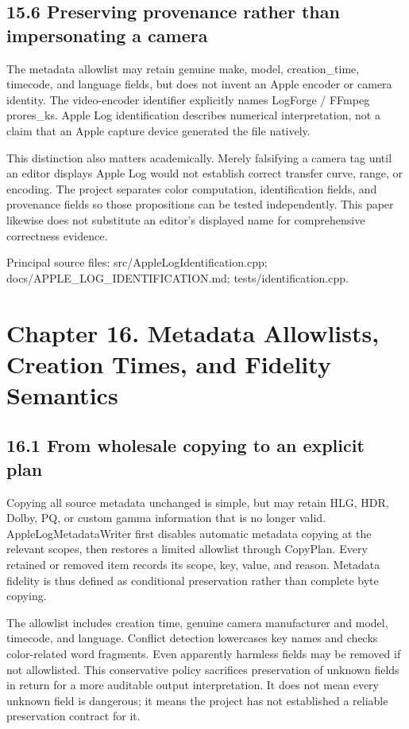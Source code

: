 \documentclass[11pt,a4paper,openany]{book}
\begin{document}
\section*{15.6 Preserving provenance rather than impersonating a camera}
The metadata allowlist may retain genuine make, model, creation\_time, timecode, and language fields, but does not invent an Apple encoder or camera identity. The video-encoder identifier explicitly names LogForge / FFmpeg prores\_ks. Apple Log identification describes numerical interpretation, not a claim that an Apple capture device generated the file natively.

This distinction also matters academically. Merely falsifying a camera tag until an editor displays Apple Log would not establish correct transfer curve, range, or encoding. The project separates color computation, identification fields, and provenance fields so those propositions can be tested independently. This paper likewise does not substitute an editor's displayed name for comprehensive correctness evidence.


\par\small Principal source files: src/AppleLogIdentification.cpp; docs/APPLE\_LOG\_IDENTIFICATION.md; tests/identification.cpp.\normalsize

\chapter*{Chapter 16. Metadata Allowlists, Creation Times, and Fidelity Semantics}

\section*{16.1 From wholesale copying to an explicit plan}
Copying all source metadata unchanged is simple, but may retain HLG, HDR, Dolby, PQ, or custom gamma information that is no longer valid. AppleLogMetadataWriter first disables automatic metadata copying at the relevant scopes, then restores a limited allowlist through CopyPlan. Every retained or removed item records its scope, key, value, and reason. Metadata fidelity is thus defined as conditional preservation rather than complete byte copying.

The allowlist includes creation time, genuine camera manufacturer and model, timecode, and language. Conflict detection lowercases key names and checks color-related word fragments. Even apparently harmless fields may be removed if not allowlisted. This conservative policy sacrifices preservation of unknown fields in return for a more auditable output interpretation. It does not mean every unknown field is dangerous; it means the project has not established a reliable preservation contract for it.
\end{document}
